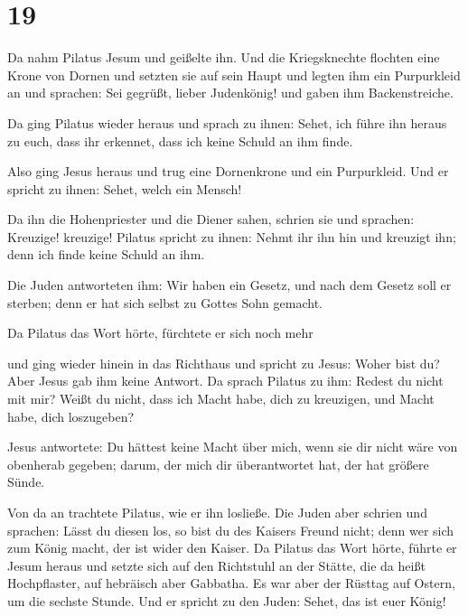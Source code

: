 \hypertarget{section-18}{%
\section{19}\label{section-18}}

 Da nahm Pilatus Jesum und geißelte ihn. 
Und die Kriegsknechte flochten eine Krone von Dornen und setzten sie auf
sein Haupt und legten ihm ein Purpurkleid an  und
sprachen: Sei gegrüßt, lieber Judenkönig! und gaben ihm Backenstreiche.

 Da ging Pilatus wieder heraus und sprach zu ihnen: Sehet,
ich führe ihn heraus zu euch, dass ihr erkennet, dass ich keine Schuld
an ihm finde.

 Also ging Jesus heraus und trug eine Dornenkrone und ein
Purpurkleid. Und er spricht zu ihnen: Sehet, welch ein Mensch!

 Da ihn die Hohenpriester und die Diener sahen, schrien
sie und sprachen: Kreuzige! kreuzige! Pilatus spricht zu ihnen: Nehmt
ihr ihn hin und kreuzigt ihn; denn ich finde keine Schuld an ihm.

 Die Juden antworteten ihm: Wir haben ein Gesetz, und nach
dem Gesetz soll er sterben; denn er hat sich selbst zu Gottes Sohn
gemacht.

 Da Pilatus das Wort hörte, fürchtete er sich noch mehr

 und ging wieder hinein in das Richthaus und spricht zu
Jesus: Woher bist du? Aber Jesus gab ihm keine Antwort. 
Da sprach Pilatus zu ihm: Redest du nicht mit mir? Weißt du nicht, dass
ich Macht habe, dich zu kreuzigen, und Macht habe, dich loszugeben?

 Jesus antwortete: Du hättest keine Macht über mich, wenn
sie dir nicht wäre von obenherab gegeben; darum, der mich dir
überantwortet hat, der hat größere Sünde.

 Von da an trachtete Pilatus, wie er ihn losließe. Die
Juden aber schrien und sprachen: Lässt du diesen los, so bist du des
Kaisers Freund nicht; denn wer sich zum König macht, der ist wider den
Kaiser.  Da Pilatus das Wort hörte, führte er Jesum
heraus und setzte sich auf den Richtstuhl an der Stätte, die da heißt
Hochpflaster, auf hebräisch aber Gabbatha.  Es war aber
der Rüsttag auf Ostern, um die sechste Stunde. Und er spricht zu den
Juden: Sehet, das ist euer König!

